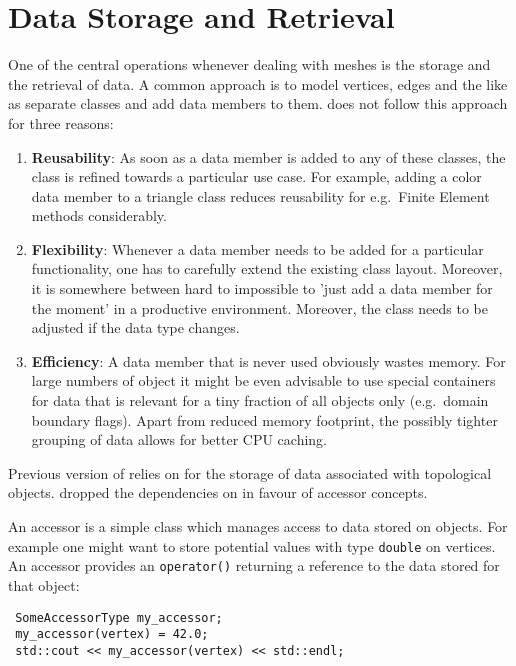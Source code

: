 \chapter{Data Storage and Retrieval} \label{chap:data}

One of the central operations whenever dealing with meshes is the storage and the retrieval of data.
A common approach is to model vertices, edges and the like as separate classes and add data members to them.
{\ViennaGrid} does not follow this approach for three reasons:
\begin{enumerate}
 \item \textbf{Reusability}: As soon as a data member is added to any of these classes, the class is refined towards a particular use case. For example, adding a color data member to a triangle class reduces reusability for e.g.~Finite Element methods considerably.
 \item \textbf{Flexibility}: Whenever a data member needs to be added for a particular functionality, one has to carefully extend the existing class layout. Moreover, it is somewhere between hard to impossible to 'just add a data member for the moment' in a productive environment. Moreover, the class needs to be adjusted if the data type changes.
 \item \textbf{Efficiency}: A data member that is never used obviously wastes memory. For large numbers of object it might be even advisable to use special containers for data that is relevant for a tiny fraction of all objects only (e.g.~domain boundary flags). Apart from reduced memory footprint, the possibly tighter grouping of data allows for better CPU caching. 
\end{enumerate}

Previous version of {\ViennaGrid} relies on {\ViennaData} \cite{ViennaData} for the storage of data associated with topological objects. {\ViennaGridversion} dropped the dependencies on {\ViennaData} in favour of accessor concepts.

An accessor is a simple class which manages access to data stored on objects. For example one might want to store potential values with type \lstinline|double| on vertices. An accessor provides an  \lstinline|operator()| returning a reference to the data stored for that object:

\begin{lstlisting}
 SomeAccessorType my_accessor;
 my_accessor(vertex) = 42.0;
 std::cout << my_accessor(vertex) << std::endl;
\end{lstlisting}

